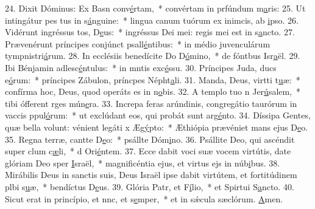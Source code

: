 24. Dixit Dóminus: Ex Basn conv\uline{é}rtam,~* convértam in prfúndum m\uline{a}ris:
25. Ut intingátur pes tus in s\uline{á}nguine:~* lingua canum tuórum ex inimcis, ab \uline{i}pso.
26. Vidérunt ingréssus tos, D\uline{e}us:~* ingréssus Dei mei: regis mei  est in s\uline{a}ncto.
27. Prævenérunt príncipes conjúnct psall\uline{é}ntibus:~* in médio juvenculárum tympnistri\uline{á}rum.
28. In ecclésiis benedícite Do D\uline{ó}mino,~* de fóntbus Isr\uline{a}ël.
29. Ibi Bénjamin adlesc\uline{é}ntulus:~* in mntis exc\uline{é}ssu.
30. Príncipes Juda, ducs e\uline{ó}rum:~* príncipes Zábulon, príncpes Népht\uline{a}li.
31. Manda, Deus, virtti t\uline{u}æ:~* confírma hoc, Deus, quod operáts es in n\uline{o}bis.
32. A templo tuo n Jer\uline{ú}salem,~* tibi ófferent rges mún\uline{e}ra.
33. Increpa feras arúndinis, congregátio taurórum in vaccis ppul\uline{ó}rum:~* ut exclúdant eos, qui probát sunt arg\uline{é}nto.
34. Díssipa Gentes, quæ bella volunt: vénient legáti x Æg\uline{ý}pto:~* Æthiópia prævéniet mans ejus D\uline{e}o.
35. Regna terræ, cantte D\uline{e}o:~* psállte Dóm\uline{i}no.
36. Psállite Deo, qui ascéndit super clum c\uline{æ}li,~* d Ori\uline{é}ntem.
37. Ecce dabit voci suæ vocem virtútis, date glóriam Deo sper \uline{I}sraël,~* magnificéntia ejus, et virtus ejs in núb\uline{i}bus.
38. Mirábilis Deus in sanctis suis, Deus Israël ipse dabit virtútem, et fortitúdinem plbi s\uline{u}æ,~* bendíctus D\uline{e}us.
39. Glória Patr, et F\uline{í}lio,~* et Spirtui S\uline{a}ncto.
40. Sicut erat in princípio, et nnc, et s\uline{e}mper,~* et in sǽcula sæclórum. \uline{A}men.
